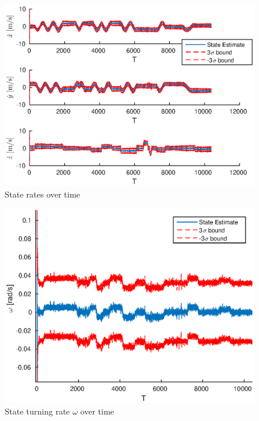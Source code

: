 \documentclass{article}
\begin{document}
\begin{figure}[!htbp]
	\centering
	\includegraphics[scale=0.7]{figs/state_rate.eps}
	\caption{State rates over time}
	\label{fig:state_rate}
\end{figure}

\begin{figure}[!htbp]
	\centering
	\includegraphics[scale=0.7]{figs/state_turning.eps}
	\caption{State turning rate $\omega$ over time}
	\label{fig:state_turning}
\end{figure}
\end{document}
